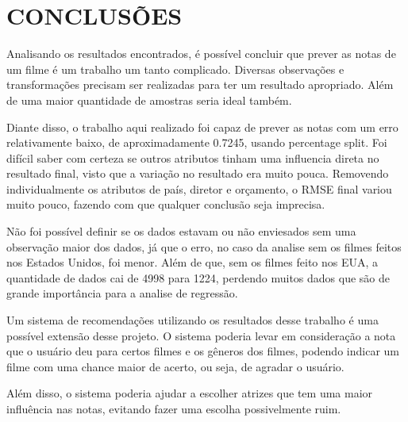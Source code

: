\section{CONCLUSÕES}
Analisando os resultados encontrados, é possível concluir que prever as notas de um filme é um trabalho um tanto complicado. Diversas observações e transformações precisam ser realizadas para ter um resultado apropriado. Além de uma maior quantidade de amostras seria ideal também.

Diante disso, o trabalho aqui realizado foi capaz de prever as notas com um erro relativamente baixo, de aproximadamente 0.7245, usando percentage split. Foi difícil saber com certeza se outros atributos tinham uma influencia direta no resultado final, visto que a variação no resultado era muito pouca. Removendo individualmente os atributos de país, diretor e orçamento, o RMSE final variou muito pouco, fazendo com que qualquer conclusão seja imprecisa.

Não foi possível definir se os dados estavam ou não enviesados sem uma observação maior dos dados, já que o erro, no caso da analise sem os filmes feitos nos Estados Unidos, foi menor. Além de que, sem os filmes feito nos EUA, a quantidade de dados cai de 4998 para 1224, perdendo muitos dados que são de grande importância para a analise de regressão.

Um sistema de recomendações utilizando os resultados desse trabalho é uma possível extensão desse projeto. O sistema poderia levar em consideração a nota que o usuário deu para certos filmes e os gêneros dos filmes, podendo indicar um filme com uma chance maior de acerto, ou seja, de agradar o usuário.

Além disso, o sistema poderia ajudar a escolher atrizes que tem uma maior influência nas notas, evitando fazer uma escolha possivelmente ruim.